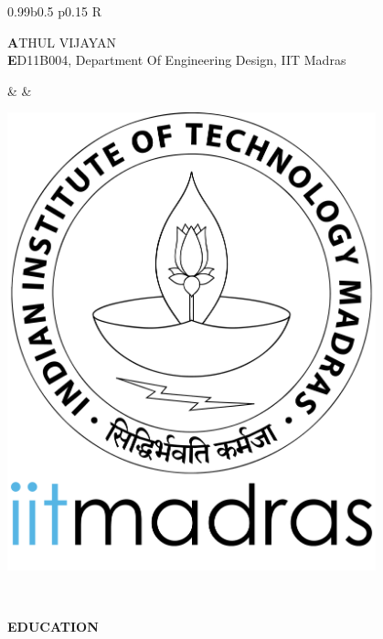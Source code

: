 \documentclass[a4paper,10pt]{article}
\newcommand{\lsep}{-0.5cm}
\newcommand{\resheading}[1]{{\small \colorbox{mygrey}{\begin{minipage}{0.975\textwidth}{\textbf{#1 \vphantom{p\^{E}}}}\end{minipage}}}}
\begin{document}

\indent
\begin{tabularx}{0.99\textwidth}{b{} p{} R}
    \specialrule{.05em}{1em}{0em}
    \begin{minipage}{\textwidth}
    \vspace{20pt}
        {\fontsize{12pt}{1em}\selectfont \textbf ATHUL VIJAYAN} \\
        { \textbf ED11B004, Department Of Engineering Design, IIT Madras}
    \end{minipage} & &
    \begin{minipage}[l]{.1\textwidth}%
        \vspace{5pt}
        \includegraphics[width=0.8\textwidth]{../iitmlogo.png}
    \end{minipage}\\

    \specialrule{.1em}{.05em}{.05em}
\end{tabularx}

\resheading{\textbf{EDUCATION} }\\[\lsep]
    \\
\end{document}
